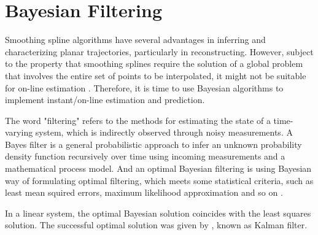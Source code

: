 







\section{Bayesian Filtering}

Smoothing spline algorithms have several advantages in inferring and characterizing planar trajectories, particularly in reconstructing. However, subject to the property that smoothing splines require the solution of a global problem that involves the entire set of points to be interpolated, it might not be suitable for on-line estimation \cite{biagiotti2013online}. Therefore, it is time to use Bayesian algorithms to implement instant/on-line estimation and prediction. 


The word "filtering" refers to the methods for estimating the state of a time-varying system, which is indirectly observed through noisy measurements. A Bayes filter is a general probabilistic approach to infer an unknown probability density function recursively over time using incoming measurements and a mathematical process model. And an optimal Bayesian filtering is using Bayesian way of formulating optimal filtering, which meets some statistical criteria, such as least mean squired errors, maximum likelihood approximation and so on \cite{chen2003bayesian} \cite{sarkka2013bayesian}.  


In a linear system, the optimal Bayesian solution coincides with the least squares solution. The successful optimal solution was given by \cite{kalman1960new},  known as Kalman filter.  

